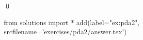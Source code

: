 
\begin{ex} 
  \label{ex:pda2}
  
  \qed
\end{ex} 
\begin{python0}
from solutions import *
add(label="ex:pda2",
    srcfilename='exercises/pda2/answer.tex') 
\end{python0}
